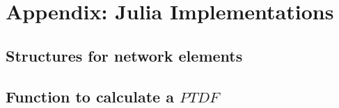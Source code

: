\appendix				
\section{Appendix: Julia Implementations}

\subsection{Structures for network elements}
\label{sec:appendix:jl:ne}



\subsection{Function to calculate a $PTDF$}
\label{sec:appendix:jl:ptdf}


